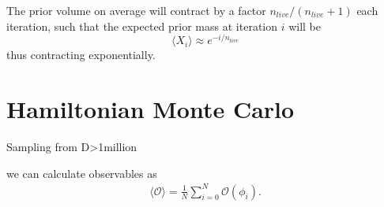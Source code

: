 \documentclass[11pt]{article}
\begin{document}
    The prior volume on average will contract by a factor $n_{live}/(n_{live}+1)$ each iteration, such that the
    expected prior mass at iteration $i$ will be
    \begin{equation}\label{eq:exp_prior_volume}
        \langle X_i \rangle \approx e^{-i/n_{live}}
    \end{equation}
    thus contracting exponentially.

    \section{Hamiltonian Monte Carlo}\label{sec:hamiltonian_monte_carlo}
    Sampling from D>1million

    we can calculate observables as
    \begin{equation}\label{eq:field_observable}
    \begin{aligned}
        \langle \mathcal{O} \rangle = \frac{1}{N}\sum_{i=0}^N \mathcal{O}(\phi_i).
    \end{aligned}
    \end{equation}
\end{document}
